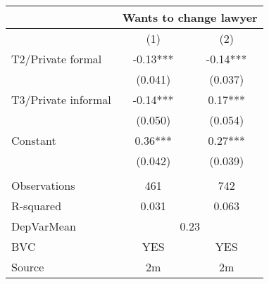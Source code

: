 \begin{tabular}{lcc}
\toprule
      & \multicolumn{2}{c}{Wants to change lawyer} \\
\midrule
\midrule
      & (1)   & (2) \\
\midrule
\midrule
T2/Private formal & -0.13*** & -0.14*** \\
      & (0.041) & (0.037) \\
T3/Private informal & -0.14*** & 0.17*** \\
      & (0.050) & (0.054) \\
Constant & 0.36*** & 0.27*** \\
      & (0.042) & (0.039) \\
      &       &  \\
\midrule
Observations & 461   & 742 \\
R-squared & 0.031 & 0.063 \\
DepVarMean & \multicolumn{2}{c}{0.23} \\
BVC   & YES   & YES \\
Source & 2m    & 2m \\
\bottomrule
\bottomrule
\end{tabular}%
